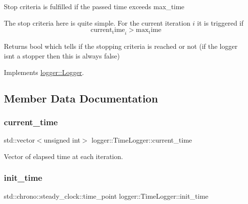 Stop criteria is fulfilled if the passed time exceeds {\ttfamily max\+\_\+time} 

The stop criteria here is quite simple. For the current iteration $i$ it is triggered if \[ \mathrm{current_time}_i > \mathrm{max_time} \]

\begin{DoxyReturn}{Returns}
{\ttfamily bool} which tells if the stopping criteria is reached or not (if the logger isn\textquotesingle{}t a stopper then this is always false) 
\end{DoxyReturn}


Implements \mbox{\hyperlink{classlogger_1_1_logger_aed91421c07062b91cee158ef2bda7ae8}{logger\+::\+Logger}}.



\subsection{Member Data Documentation}
\mbox{\label{classlogger_1_1_time_logger_a57bbc70bcc5e0fb1b1a62d49af30bf3b}} 
\subsubsection{\texorpdfstring{current\+\_\+time}{current\_time}}
{\footnotesize\ttfamily std\+::vector$<$unsigned int$>$ logger\+::\+Time\+Logger\+::current\+\_\+time\hspace{0.3cm}{\ttfamily [private]}}



Vector of elapsed time at each iteration. 

\mbox{\label{classlogger_1_1_time_logger_ac6bc060040da5dc7b8b20bdae3b7cd2b}} 
\subsubsection{\texorpdfstring{init\+\_\+time}{init\_time}}
{\footnotesize\ttfamily std\+::chrono\+::steady\+\_\+clock\+::time\+\_\+point logger\+::\+Time\+Logger\+::init\+\_\+time\hspace{0.3cm}{\ttfamily [private]}}



